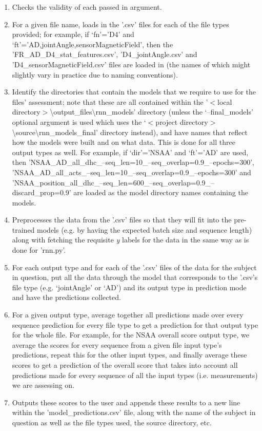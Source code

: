 \documentclass[12pt,twoside]{report}
\begin{document}
\begin{enumerate}
	\item Checks the validity of each passed in argument.
	\item For a given file name, loads in the '.csv' files for each of the file types provided; for example, if ‘fn’='D4' and ‘ft’='AD,jointAngle,sensorMagneticField', then the 'FR\_AD\_D4\_stat\_features.csv', 'D4\_jointAngle.csv' and 'D4\_sensorMagneticField.csv' files are loaded in (the names of which might slightly vary in practice due to naming conventions).
	\item Identify the directories that contain the models that we require to use for the files' assessment; note that these are all contained within the '$<$local directory$>$\textbackslash output\_files\textbackslash rnn\_models' directory (unless the ‘--final\_models’ optional argument is used which uses the ‘$<$project directory$>$\textbackslash source\textbackslash rnn\_models\_final’ directory instead), and have names that reflect how the models were built and on what data. This is done for all three output types as well. For example, if ‘dir’='NSAA' and ‘ft’='AD' are used, then 'NSAA\_AD\_all\_dhc\_--seq\_len=10\_--seq\_overlap=0.9\_--epochs=300', 'NSAA\_AD\_all\_acts\_--seq\_len=10\_--seq\_overlap=0.9\_--epochs=300' and 'NSAA\_position\_all\_dhc\_--seq\_len=600\_--seq\_overlap=0.9\_--discard\_prop=0.9' are loaded as the model directory names containing the models.
	\item Preprocesses the data from the '.csv' files so that they will fit into the pre-trained models (e.g. by having the expected batch size and sequence length) along with fetching the requisite \textit{y} labels for the data in the same way as is done for 'rnn.py'.
	\item For each output type and for each of the '.csv' files of the data for the subject in question, put all the data through the model that corresponds to the '.csv's file type (e.g. ‘jointAngle’ or ‘AD’) and its output type in prediction mode and have the predictions collected.
	\item For a given output type, average together all predictions made over every sequence prediction for every file type to get a prediction for that output type for the whole file. For example, for the NSAA overall score output type, we average the scores for every sequence from a given file input type's predictions, repeat this for the other input types, and finally average these scores to get a prediction of the overall score that takes into account all predictions made for every sequence of all the input types (i.e. measurements) we are assessing on.
	\item Outputs these scores to the user and appends these results to a new line within the 'model\_predictions.csv' file, along with the name of the subject in question as well as the file types used, the source directory, etc.
\end{enumerate}
\end{document}
